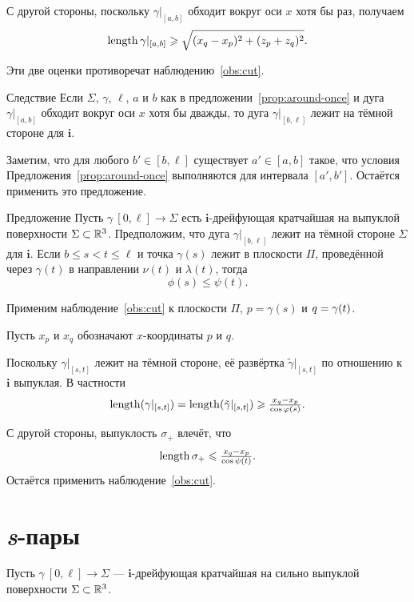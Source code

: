 \documentclass[a4paper,10pt]{article}
\begin{document}
С другой стороны, поскольку $\gamma|_{[a,b]}$ обходит вокруг оси $x$ хотя бы раз,
получаем 
\[\mathop{\rm length}\nolimits\gamma|_{[a,b]}\geqslant \sqrt{(x_q-x_p)^2+(z_p+z_q)^2}.\]

Эти две оценки противоречат наблюдению~\ref{obs:cut}.
\qeds

\begin{thm}{Следствие}\label{cor:around-twice}
Если $\Sigma$, $\gamma$, $\ell$, $a$ и $b$ как в предложении~\ref{prop:around-once} 
и дуга $\gamma|_{[a,b]}$ обходит вокруг оси $x$ хотя бы дважды,
то дуга $\gamma|_{[b,\ell]}$ лежит на тёмной стороне для $\bm{i}$.
\end{thm}

Заметим, что для любого $b'\in [b,\ell]$
существует $a'\in [a,b]$ 
такое, что условия Предложения~\ref{prop:around-once} выполняются для интервала $[a',b']$. 
Остаётся применить это предложение.
\qeds 


\begin{thm}{Предложение}\label{prop:phi-psi}
Пусть $\gamma\:[0,\ell]\to \Sigma$ есть $\bm{i}$-дрейфующая кратчайшая на выпуклой поверхности $\Sigma\subset \mathbb{R}^3$.
Предположим, что дуга $\gamma|_{[b,\ell]}$ 
лежит на тёмной стороне $\Sigma$ для $\bm{i}$.
Если $b\le s<t\le \ell$ и точка $\gamma(s)$ лежит в плоскости $\Pi$, проведённой через $\gamma(t)$ 
в направлении $\nu(t)$ и $\lambda(t)$,
тогда
\[\phi(s)\le \psi(t).\]
\end{thm}

Применим наблюдение~\ref{obs:cut} к плоскости $\Pi$, $p=\gamma(s)$ и $q\zz=\gamma(t)$.

Пусть $x_p$ и $x_q$ обозначают $x$-координаты $p$ и $q$.

Поскольку $\gamma|_{[s,t]}$ лежит на тёмной стороне,
её развёртка $\tilde\gamma|_{[s,t]}$ 
по отношению к $\bm{i}$ выпуклая.
В частности
\[\mathop{\rm length}\nolimits(\gamma|_{[s,t]})
=
\mathop{\rm length}\nolimits(\tilde\gamma|_{[s,t]})
\geqslant
\tfrac{x_q-x_p}{\cos\varphi(s)}.\]

С другой стороны, выпуклость $\sigma_+$ влечёт, что
\[\mathop{\rm length}\nolimits\sigma_+\leqslant \tfrac{x_q-x_p}{\cos\psi(t)}.\]
Остаётся применить наблюдение~\ref{obs:cut}.
\qeds

\section{\textit{s}-пары}

Пусть  $\gamma\:[0,\ell]\to\Sigma$ --- $\bm{i}$-дрейфующая кратчайшая
на сильно выпуклой поверхности $\Sigma\subset \mathbb{R}^3$.
\end{document}
